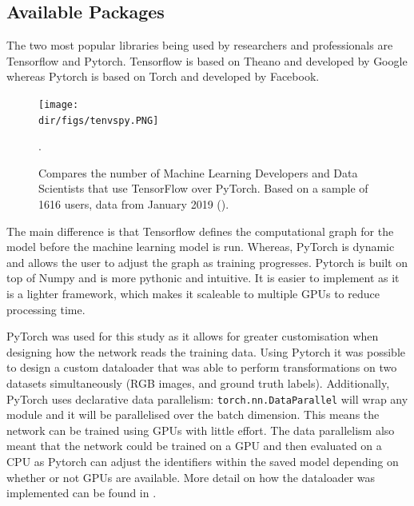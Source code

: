 \subsection{Available Packages}
The two most popular libraries being used by researchers and professionals are Tensorflow and Pytorch. Tensorflow is based on Theano and developed by Google whereas Pytorch is based on Torch and developed by Facebook.
\begin{figure}[htpb]
    \centering
    \texttt{[image: \\dir/figs/tenvspy.PNG]}
    \caption[TensorFlow versus PyTorch Usage]{Compares the number of Machine Learning Developers and Data Scientists that use TensorFlow over PyTorch. Based on a sample of 1616 users, data from January 2019 (\cite{Rosenzvaig19}). }.
    \label{fig.tfvspy}
\end{figure}
The main difference is that Tensorflow defines the computational graph for the model before the machine learning model is run. Whereas, PyTorch is dynamic and allows the user to adjust the graph as training progresses. Pytorch is built on top of Numpy and is more pythonic and intuitive. It is easier to implement as it is a lighter framework, which makes it scaleable to multiple GPUs to reduce processing time.
\par
PyTorch was used for this study as it allows for greater customisation when designing how the network reads the training data. Using Pytorch it was possible to design a custom dataloader that was able to perform transformations on two datasets simultaneously (RGB images, and ground truth labels). Additionally, PyTorch uses declarative data parallelism:  \texttt{torch.nn.DataParallel} will wrap any module and it will be parallelised over the batch dimension. This means the network can be trained using GPUs with little effort. The data parallelism also meant that the network could be trained on a GPU and then evaluated on a CPU as Pytorch can adjust the identifiers within the saved model depending on whether or not GPUs are available. More detail on how the dataloader was implemented can be found in \citet{Richmond19b}.